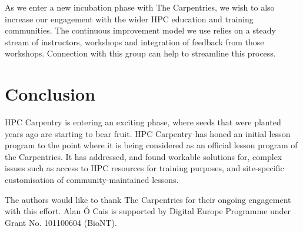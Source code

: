 As we enter a new incubation phase with The Carpentries, we wish to also increase our engagement with the wider HPC education and training communities. The continuous improvement model we use relies on a steady stream of instructors, workshops and integration of feedback from those workshops. Connection with this group can help to streamline this process.

\section{Conclusion}

HPC Carpentry is entering an exciting phase, where seeds that were planted years ago are starting to bear fruit. HPC Carpentry has honed an initial lesson program to the point where it is being considered as an official lesson program of the Carpentries. It has addressed, and found workable solutions for, complex issues such as access to HPC resources for training purposes, and site-specific customisation of community-maintained lessons.

\begin{acks}
  The authors would like to thank The Carpentries for their ongoing engagement with this effort. Alan \'O Cais is
  supported by Digital Europe Programme under Grant
  No. 101100604 (BioNT).
\end{acks}
